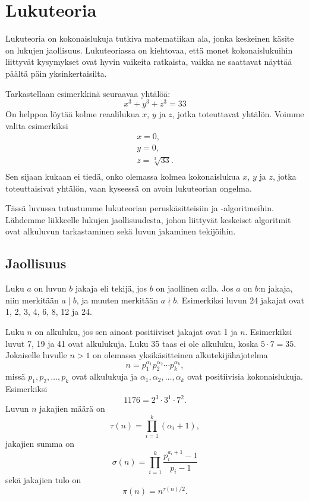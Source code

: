 \chapter{Lukuteoria}

Lukuteoria on kokonaislukuja tutkiva
matematiikan ala, jonka keskeinen
käsite on lukujen jaollisuus.
Lukuteoriassa on kiehtovaa, että monet kokonaislukuihin
liittyvät kysymykset ovat hyvin vaikeita ratkaista,
vaikka ne saattavat näyttää päältä päin yksinkertaisilta.

Tarkastellaan esimerkkinä seuraavaa yhtälöä:
\[x^3 + y^3 + z^3 = 33\]
On helppoa löytää kolme reaalilukua $x$, $y$ ja $z$,
jotka toteuttavat yhtälön. Voimme valita
esimerkiksi
\[
\begin{array}{lcl}
x = 0, \\
y = 0, \\
z = \sqrt[3]{33}.\\
\end{array}
\]
Sen sijaan kukaan ei tiedä, onko olemassa
kolmea kokonaislukua $x$, $y$ ja $z$,
jotka toteuttaisivat yhtälön, vaan kyseessä
on avoin lukuteorian ongelma.

Tässä luvussa tutustumme lukuteorian peruskäsitteisiin ja
-algoritmeihin.
Lähdemme liikkeelle lukujen jaollisuudesta,
johon liittyvät keskeiset algoritmit ovat
alkuluvun tarkastaminen sekä luvun jakaminen tekijöihin.

\section{Jaollisuus}


Luku $a$ on luvun $b$ jakaja eli tekijä,
jos $b$ on jaollinen $a$:lla.
Jos $a$ on $b$:n jakaja,
niin merkitään $a \mid b$,
ja muuten merkitään $a \nmid b$.
Esimerkiksi luvun 24 jakajat ovat 1, 2, 3, 4, 6, 8, 12 ja 24.


Luku $n$ on alkuluku, jos sen ainoat 
positiiviset jakajat ovat 1 ja $n$.
Esimerkiksi luvut 7, 19 ja 41 ovat alkulukuja.
Luku 35 taas ei ole alkuluku, koska $5 \cdot 7 = 35$.
Jokaiselle luvulle $n>1$ on olemassa yksikäsitteinen
alkutekijähajotelma
\[ n = p_1^{\alpha_1} p_2^{\alpha_2} \cdots p_k^{\alpha_k},\]
missä $p_1,p_2,\ldots,p_k$ ovat alkulukuja
ja $\alpha_1,\alpha_2,\ldots,\alpha_k$ ovat positiivisia
kokonaislukuja. Esimerkiksi
\[1176 = 2^3 \cdot 3^1 \cdot 7^2.\]
Luvun $n$ jakajien määrä on
\[\tau(n)=\prod_{i=1}^k (\alpha_i+1),\]
jakajien summa on
\[\sigma(n)=\prod_{i=1}^k \frac{p_i^{a_i+1}-1}{p_i-1}\]
sekä jakajien tulo on
\[\pi(n)=n^{\tau(n)/2}.\]

